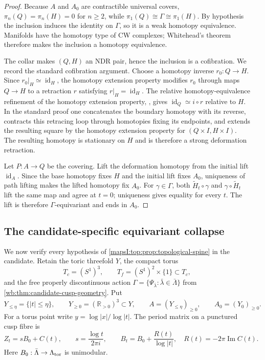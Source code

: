 \begin{proof}
Because $A$ and $A_0$ are contractible universal covers,
$\pi_n(Q)=\pi_n(H)=0$ for $n\ge2$, while
$\pi_1(Q)\cong\Gamma\cong\pi_1(H)$.  By hypothesis the inclusion induces the
identity on $\Gamma$, so it is a weak homotopy equivalence.  Manifolds have
the homotopy type of CW complexes; Whitehead's theorem
\cite[Theorem~4.5]{Hatcher2002} therefore makes the inclusion a homotopy
equivalence.

The collar makes $(Q,H)$ an NDR pair, hence the inclusion is a cofibration.
We record the standard cofibration argument.  Choose a homotopy inverse
$r_0:Q\to H$.  Since $r_0|_H\simeq\operatorname{id}_H$, the homotopy
extension property modifies $r_0$ through maps $Q\to H$ to a retraction
$r$ satisfying $r|_H=\operatorname{id}_H$.  The relative homotopy-equivalence refinement of the homotopy extension
property, \cite[Proposition~0.19 and Corollary~0.20]{Hatcher2002}, gives
$\operatorname{id}_Q\simeq i\circ r$ relative to $H$.
In the standard proof one concatenates the boundary homotopy with its reverse,
contracts this retracing loop through homotopies fixing its endpoints, and
extends the resulting square by the homotopy extension property for
$(Q\times I,H\times I)$. The resulting homotopy is stationary on $H$ and
is therefore a strong deformation retraction.

Let $P:A\to Q$ be the covering.  Lift the deformation homotopy from the
initial lift $\operatorname{id}_A$.  Since the base homotopy fixes $H$ and
the initial lift fixes $A_0$, uniqueness of path lifting makes the lifted
homotopy fix $A_0$.  For $\gamma\in\Gamma$, both
$\widetilde H_t\circ\gamma$ and $\gamma\circ\widetilde H_t$ lift the same
map and agree at $t=0$; uniqueness gives equality for every $t$.  The lift is
therefore $\Gamma$-equivariant and ends in $A_0$.
\end{proof}

\subsection{The candidate-specific equivariant collapse}

We now verify every hypothesis of \cref{mapsI:top:prop:topological-spine} in the
candidate.  Retain the toric threefold $Y$, the compact torus
\[
 T_c=(S^1)^3,\qquad T_f=(S^1)^2\times\{1\}\subset T_c,
\]
and the free properly discontinuous action
$\Gamma=\{\Psi_{\bar\lambda}:\bar\lambda\in\bar\Lambda\}$ from
\cref{wb:thm:candidate-cusp-geometry}.  Put
\[
 Y_{\leq\eta}=\{|t|\leq\eta\},\qquad
 Y_{\geq0}=\overline{(\mathbb R_{>0})^3}\subset Y,\qquad
 A=(Y_{\leq\eta})_{\geq0},\qquad A_0=(Y_0)_{\geq0}.
\tag{TM.C.1}
\]
For a torus point write $y=\log|x|/\log|t|$.  The period matrix on a
punctured cusp fibre is
\[
 Z_t=sB_0+C(t),\qquad s=\frac{\log t}{2\pi i},\qquad
 B_t=B_0+\frac{R(t)}{\log|t|},\quad R(t)=-2\pi\operatorname{Im}C(t).
\tag{TM.C.2}
\]
Here $B_0:\bar\Lambda\to\Lambda_{\rm tor}$ is unimodular.

